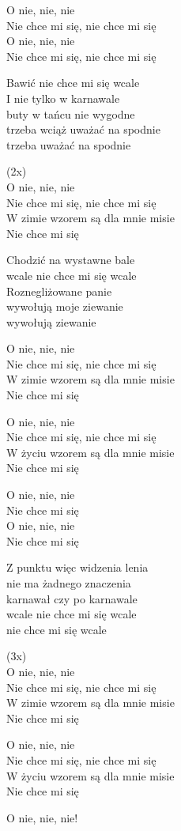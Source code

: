 \begin{text}
\vin O nie, nie, nie\\
\vin Nie chce mi się, nie chce mi się\\
\vin O nie, nie, nie\\
\vin Nie chce mi się, nie chce mi się

Bawić nie chce mi się wcale\\
I nie tylko w karnawale\\
buty w tańcu nie wygodne\\
trzeba wciąż uważać na spodnie\\
trzeba uważać na spodnie

\vin (2x)\\
\vin O nie, nie, nie\\
\vin Nie chce mi się, nie chce mi się\\
\vin W zimie wzorem są dla mnie misie\\
\vin Nie chce mi się

Chodzić na wystawne bale\\
wcale nie chce mi się wcale\\
Roznegliżowane panie\\
wywołują moje ziewanie\\
wywołują ziewanie

\vin O nie, nie, nie\\
\vin Nie chce mi się, nie chce mi się\\
\vin W zimie wzorem są dla mnie misie\\
\vin Nie chce mi się

\vin O nie, nie, nie\\
\vin Nie chce mi się, nie chce mi się\\
\vin W życiu wzorem są dla mnie misie\\
\vin Nie chce mi się

\vin O nie, nie, nie\\
\vin Nie chce mi się\\
\vin O nie, nie, nie\\
\vin Nie chce mi się

Z punktu więc widzenia lenia\\
nie ma żadnego znaczenia\\
karnawał czy po karnawale\\
wcale nie chce mi się wcale\\
nie chce mi się wcale

\vin (3x)\\
\vin O nie, nie, nie\\
\vin Nie chce mi się, nie chce mi się\\
\vin W zimie wzorem są dla mnie misie\\
\vin Nie chce mi się

\vin O nie, nie, nie\\
\vin Nie chce mi się, nie chce mi się\\
\vin W życiu wzorem są dla mnie misie\\
\vin Nie chce mi się

\vin O nie, nie, nie!
\end{text}
